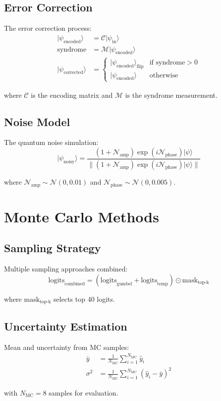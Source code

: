 \documentclass{article}
\begin{document}
\subsection{Error Correction}
The error correction process:
\begin{align*}
|\psi_{\text{encoded}}\rangle &= \mathcal{C}|\psi_{\text{in}}\rangle \\
\text{syndrome} &= \mathcal{M}|\psi_{\text{encoded}}\rangle \\
|\psi_{\text{corrected}}\rangle &= \begin{cases}
|\psi_{\text{encoded}}\rangle_{\text{flip}} & \text{if syndrome} > 0 \\
|\psi_{\text{encoded}}\rangle & \text{otherwise}
\end{cases}
\end{align*}

where $\mathcal{C}$ is the encoding matrix and $\mathcal{M}$ is the syndrome measurement.

\subsection{Noise Model}
The quantum noise simulation:
\begin{equation}
|\psi_{\text{noisy}}\rangle = \frac{(1 + \mathcal{N}_{\text{amp}})\exp(i\mathcal{N}_{\text{phase}})|\psi\rangle}{\|(1 + \mathcal{N}_{\text{amp}})\exp(i\mathcal{N}_{\text{phase}})|\psi\rangle\|}
\end{equation}

where $\mathcal{N}_{\text{amp}} \sim \mathcal{N}(0,0.01)$ and $\mathcal{N}_{\text{phase}} \sim \mathcal{N}(0,0.005)$.

\section{Monte Carlo Methods}

\subsection{Sampling Strategy}
Multiple sampling approaches combined:
\begin{equation}
\text{logits}_{\text{combined}} = (\text{logits}_{\text{gumbel}} + \text{logits}_{\text{temp}}) \odot \text{mask}_{\text{top-k}}
\end{equation}

where $\text{mask}_{\text{top-k}}$ selects top 40 logits.

\subsection{Uncertainty Estimation}
Mean and uncertainty from MC samples:
\begin{align*}
\bar{y} &= \frac{1}{N_{\text{MC}}}\sum_{i=1}^{N_{\text{MC}}} \hat{y}_i \\
\sigma^2 &= \frac{1}{N_{\text{MC}}}\sum_{i=1}^{N_{\text{MC}}}(\hat{y}_i - \bar{y})^2
\end{align*}

with $N_{\text{MC}}=8$ samples for evaluation.



\end{document}
